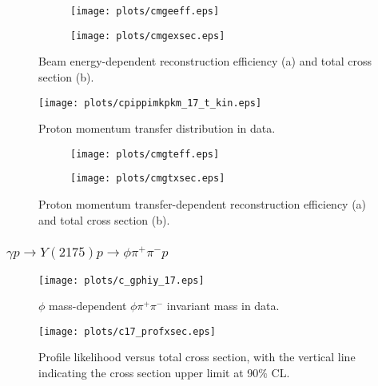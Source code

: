 \begin{figure}[H]
    \centering
    \begin{subfigure}[b]{0.45\textwidth}
        \texttt{[image: plots/cmgeeff.eps]}
        \caption{}
        \label{fig.4.5.1.4.a}
    \end{subfigure}
    \begin{subfigure}[b]{0.45\textwidth}
        \texttt{[image: plots/cmgexsec.eps]}
        \caption{}
        \label{fig.4.5.1.4.b}
    \end{subfigure}
    \caption{Beam energy-dependent reconstruction efficiency (a) and total cross section (b).}
    \label{fig:4.5.1.4}
\end{figure}

\begin{figure}[H]
    \centering
    \texttt{[image: plots/cpippimkpkm\_17\_t\_kin.eps]}
    \caption{\label{fig.4.5.1.5}Proton momentum transfer distribution in data.}
\end{figure}

\begin{figure}[H]
    \centering
    \begin{subfigure}[b]{0.45\textwidth}
        \texttt{[image: plots/cmgteff.eps]}
        \caption{}
        \label{fig.4.5.1.6.a}
    \end{subfigure}
    \begin{subfigure}[b]{0.45\textwidth}
        \texttt{[image: plots/cmgtxsec.eps]}
        \caption{}
        \label{fig.4.5.1.6.b}
    \end{subfigure}
    \caption{Proton momentum transfer-dependent reconstruction efficiency (a) and total cross section (b).}
    \label{fig:4.5.1.6}
\end{figure}

\subsubsection{\texorpdfstring{$\gamma p \rightarrow Y(2175) p \rightarrow \phi \pi^+ \pi^- p$}{}}
\label{p.4.5.2}

\begin{figure}[H]
    \centering
    \texttt{[image: plots/c\_gphiy\_17.eps]}
    \caption{\label{fig.4.5.2.1}$\phi$ mass-dependent $\phi \pi^+ \pi^-$ invariant mass in data.}
\end{figure}

\begin{figure}[H]
    \centering
    \texttt{[image: plots/c17\_profxsec.eps]}
    \caption{\label{fig.4.5.2.2}Profile likelihood versus total cross section, with the vertical line indicating the cross section upper limit at 90$\%$ CL.}
\end{figure}

